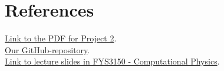 \documentclass{article}
\begin{document}
\vspace{1cm}

\section{References} \label{sec:References}


\href{https://github.com/CompPhysics/ComputationalPhysics/blob/master/doc/Projects/2019/Project2/pdf/Project2.pdf}{Link to the PDF for Project 2}. \\

\href{https://github.com/Erikbgram/Fys3150}{Our GitHub-repository}. \\

\href{https://github.com/CompPhysics/ComputationalPhysics/blob/master/doc/Lectures/lectures2015.pdf}{Link to lecture slides in FYS3150 - Computational Physics}.






\end{document}
